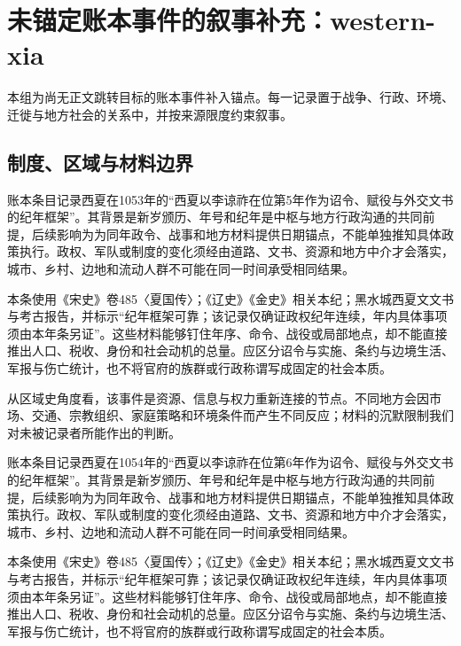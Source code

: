 \section{未锚定账本事件的叙事补充：western-xia}

\label{sec:anchor-batch-two-western-xia}

本组为尚无正文跳转目标的账本事件补入锚点。每一记录置于战争、行政、环境、迁徙与地方社会的关系中，并按来源限度约束叙事。

\subsection{制度、区域与材料边界}

账本条目记录西夏在1053年的“西夏以李谅祚在位第5年作为诏令、赋役与外交文书的纪年框架”。其背景是新岁颁历、年号和纪年是中枢与地方行政沟通的共同前提，后续影响为为同年政令、战事和地方材料提供日期锚点，不能单独推知具体政策执行。政权、军队或制度的变化须经由道路、文书、资源和地方中介才会落实，城市、乡村、边地和流动人群不可能在同一时间承受相同结果。

本条使用《宋史》卷485〈夏国传〉；《辽史》《金史》相关本纪；黑水城西夏文文书与考古报告，并标示“纪年框架可靠；该记录仅确证政权纪年连续，年内具体事项须由本年条另证”。这些材料能够钉住年序、命令、战役或局部地点，却不能直接推出人口、税收、身份和社会动机的总量。应区分诏令与实施、条约与边境生活、军报与伤亡统计，也不将官府的族群或行政称谓写成固定的社会本质。

从区域史角度看，该事件是资源、信息与权力重新连接的节点。不同地方会因市场、交通、宗教组织、家庭策略和环境条件而产生不同反应；材料的沉默限制我们对未被记录者所能作出的判断。

账本条目记录西夏在1054年的“西夏以李谅祚在位第6年作为诏令、赋役与外交文书的纪年框架”。其背景是新岁颁历、年号和纪年是中枢与地方行政沟通的共同前提，后续影响为为同年政令、战事和地方材料提供日期锚点，不能单独推知具体政策执行。政权、军队或制度的变化须经由道路、文书、资源和地方中介才会落实，城市、乡村、边地和流动人群不可能在同一时间承受相同结果。

本条使用《宋史》卷485〈夏国传〉；《辽史》《金史》相关本纪；黑水城西夏文文书与考古报告，并标示“纪年框架可靠；该记录仅确证政权纪年连续，年内具体事项须由本年条另证”。这些材料能够钉住年序、命令、战役或局部地点，却不能直接推出人口、税收、身份和社会动机的总量。应区分诏令与实施、条约与边境生活、军报与伤亡统计，也不将官府的族群或行政称谓写成固定的社会本质。

